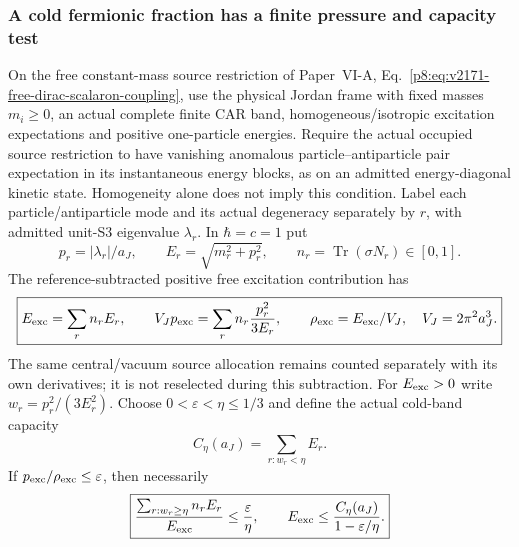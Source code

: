 \documentclass[12pt,a4paper]{article}
\begin{document}
\subsubsection{A cold fermionic fraction has a finite pressure and capacity test}
\begin{proposition}
\label{p6b:prop:v2210-lit-cold-car-capacity}
On the free constant-mass source restriction of Paper~VI-A,
Eq.~\eqref{p8:eq:v2171-free-dirac-scalaron-coupling}, use the physical
Jordan frame with fixed masses $m_i\ge0$, an actual complete finite CAR
band, homogeneous/isotropic excitation expectations and positive
one-particle energies. Require the actual occupied source restriction to
have vanishing anomalous particle--antiparticle pair expectation in its
instantaneous energy blocks, as on an admitted energy-diagonal kinetic
state. Homogeneity alone does not imply this condition. Label each
particle/antiparticle mode and its actual
degeneracy separately by $r$, with admitted unit-S3 eigenvalue $\lambda_r$.
In $\hbar=c=1$ put
\[
 p_r=|\lambda_r|/a_J,\qquad
 E_r=\sqrt{m_r^2+p_r^2},\qquad
 n_r=\operatorname{Tr}(\sigma N_r)\in[0,1].
\]
The reference-subtracted positive free excitation contribution has
\begin{equation}
\label{p6b:eq:v2210-lit-car-pressure}
 \boxed{E_{\rm exc}=\sum_rn_rE_r,\qquad
 V_Jp_{\rm exc}=\sum_rn_r\frac{p_r^2}{3E_r},\qquad
 \rho_{\rm exc}=E_{\rm exc}/V_J,
 \quad V_J=2\pi^2a_J^3.}
\end{equation}
The same central/vacuum source allocation remains counted separately
with its own derivatives; it is not reselected during this subtraction.
For $E_{\rm exc}>0$ write $w_r=p_r^2/(3E_r^2)$.
Choose $0<\varepsilon<\eta\le1/3$ and define the actual cold-band capacity
\[
 C_\eta(a_J)=\sum_{r:w_r<\eta}E_r.
\]
If $p_{\rm exc}/\rho_{\rm exc}\le\varepsilon$, then necessarily
\begin{equation}
\label{p6b:eq:v2210-lit-car-cold-capacity}
 \boxed{\frac{\sum_{r:w_r\ge\eta}n_rE_r}{E_{\rm exc}}
                 \le\frac\varepsilon\eta,\qquad
 E_{\rm exc}\le\frac{C_\eta(a_J)}{1-\varepsilon/\eta}.}
\end{equation}
\end{proposition}
\end{document}
